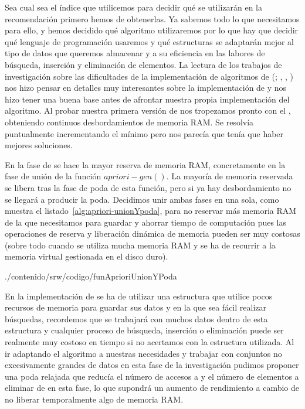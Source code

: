 Sea cual sea el índice que utilicemos para decidir qué \ars se utilizarán en la recomendación primero hemos de obtenerlas. Ya sabemos todo lo que necesitamos para ello, y hemos decidido qué algoritmo utilizaremos por lo que hay que decidir qué lenguaje de programación usaremos y qué estructuras se adaptarán mejor al tipo de datos que queremos almacenar y a su eficiencia en las labores de búsqueda, inserción y eliminación de elementos.
La lectura de los trabajos de investigación sobre las dificultades de la implementación de algoritmos de \arm (\cite{Goethals-SurveyOnFPM-2003,Borgelt-EfficientImplementationsOfAprioriAndEclat-2004}; \citeauthor{Bodon-SurprisingResultsOfTrieBasedFIMAlgorithms-2004},  \cite*{Bodon-SurprisingResultsOfTrieBasedFIMAlgorithms-2004}, \cite*{Bodon-ATrieBasedAPRIORImplementationForMFISequences-2005}) nos hizo pensar en detalles muy interesantes sobre la implementación de \apriori y nos hizo tener una buena base antes de afrontar nuestra propia implementación del algoritmo. Al probar nuestra primera versión de \apriori nos tropezamos pronto con el \dilemaIR, obteniendo continuos desbordamientos de memoria RAM. Se resolvía puntualmente incrementando el \soporte mínimo pero nos parecía que tenía que haber mejores soluciones.

En la fase de \fim se hace la mayor reserva de memoria RAM, concretamente en la fase de unión de la función $apriori-gen()$. La mayoría de memoria reservada se libera tras la fase de poda de esta función, pero si ya hay desbordamiento no se llegará a producir la poda. Decidimos unir ambas fases en una sola, como muestra el listado~\ref{alg:apriori-unionYpoda}, para no reservar más memoria RAM de la que necesitamos para guardar \aprioriC y ahorrar tiempo de computación pues las operaciones de reserva y liberación dinámica de memoria pueden ser muy costosas (sobre todo cuando se utiliza mucha memoria RAM y se ha de recurrir a la memoria virtual gestionada en el disco duro).


                 {./contenido/srw/codigo/funAprioriUnionYPoda}

En la implementación de \aprioriL se ha de utilizar una estructura que utilice pocos recursos de memoria para guardar sus datos y en la que sea fácil realizar búsquedas, recordemos que se trabajará con muchos datos dentro de esta estructura y cualquier proceso de búsqueda, inserción o eliminación puede ser realmente muy costoso en tiempo si no acertamos con la estructura utilizada. Al ir adaptando el algoritmo a nuestras necesidades y trabajar con conjuntos no excesivamente grandes de datos en esta fase de la investigación pudimos proponer una poda relajada que reducía el número de accesos a \aprioriL y el número de elementos a eliminar de \aprioriC en esta fase, lo que supondrá un aumento de rendimiento a cambio de no liberar temporalmente algo de memoria RAM.

